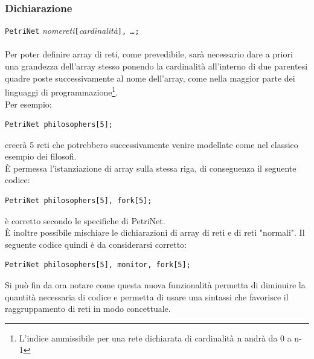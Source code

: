 \documentclass[italian,12pt]{book}
\begin{document}
\subsubsection{Dichiarazione}
{\tt PetriNet} \emph{nomereti}{\tt[}\emph{cardinalità}{\tt], \emph{\dots};}\\
\\
Per poter definire array di reti, come prevedibile, sarà necessario dare a priori una grandezza 
dell'array stesso ponendo la cardinalità all'interno di due parentesi quadre poste successivamente al nome 
dell'array, come nella maggior parte dei linguaggi di programmazione\footnote{L'indice ammissibile per una 
rete dichiarata di cardinalità n andrà da 0 a n-1}.\\
Per esempio:
\begin{verbatim}PetriNet philosophers[5];
\end{verbatim}
creerà 5 reti che potrebbero successivamente venire modellate come nel classico esempio dei filosofi.\\
È permessa l'istanziazione di array sulla stessa riga, di conseguenza il seguente codice:
\begin{verbatim}PetriNet philosophers[5], fork[5];
\end{verbatim}
è corretto secondo le specifiche di PetriNet.\\
È inoltre possibile mischiare le dichiarazioni di array di reti e di reti "normali". Il seguente codice quindi
è da considerarsi corretto:
\begin{verbatim}PetriNet philosophers[5], monitor, fork[5];
\end{verbatim}
Si può fin da ora notare come questa nuova funzionalità permetta di diminuire la quantità
necessaria di codice e permetta di usare una sintassi che favorisce il raggruppamento
di reti in modo concettuale.
\end{document}
